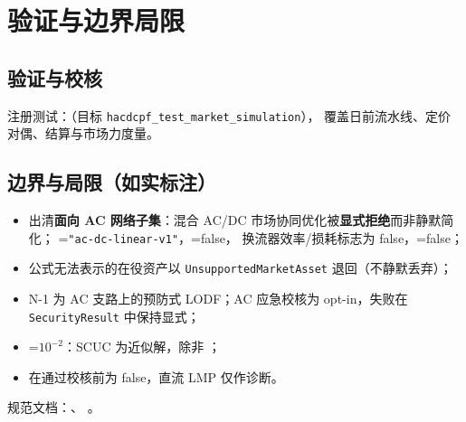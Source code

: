\documentclass[UTF8,fontset=fandol,a4paper,11pt]{ctexart}
\begin{document}
\section{验证与边界局限}
\subsection{验证与校核}
注册测试：（目标 \texttt{hacdcpf\_test\_market\_simulation}），
覆盖日前流水线、定价对偶、结算与市场力度量。

\subsection{边界与局限（如实标注）}
\begin{itemize}
  \item 出清\textbf{面向 AC 网络子集}：混合 AC/DC 市场协同优化被\textbf{显式拒绝}而非静默简化；
        =\texttt{"ac-dc-linear-v1"}，=false，
        换流器效率/损耗标志为 false，=false；
  \item 公式无法表示的在役资产以 \texttt{UnsupportedMarketAsset} 退回（不静默丢弃）；
  \item N-1 为 AC 支路上的预防式 LODF；AC 应急校核为 opt-in，失败在 \texttt{SecurityResult} 中保持显式；
  \item {}=$10^{-2}$：SCUC 为近似解，除非 ；
  \item {} 在通过校核前为 false，直流 LMP 仅作诊断。
\end{itemize}
规范文档：、
。

\end{document}
